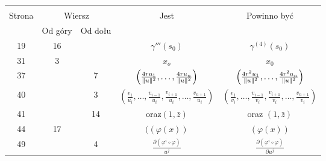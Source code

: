 \documentclass[a4paper,11pt]{article}
\begin{document}
\newpage


\vspace{\spaceFive}


\begin{center}

  \begin{tabular}{|c|c|c|c|c|}
    \hline
    & \multicolumn{2}{c|}{} & & \\
    Strona & \multicolumn{2}{c|}{Wiersz} & Jest
                              & Powinno być \\ \cline{2-3}
    & Od góry & Od dołu & & \\
    \hline
    19  & 16 & & $\gamma'''( s_{ 0 } )$ & $\gamma^{ (4) }( s_{ 0 } )$ \\
    31  &  3 & & $x_{ o }$ & $x_{ 0 }$ \\
    37  & & 7 & $\left( \frac{ 4 r u_{ 1 } }{ \lVert{  u  }\rVert^{ 2 } }, \ldots,
                \frac{ 4 r u_{ n } }{ \lVert{  u  }\rVert^{ 2 } } \right)$
           & $\left( \frac{ 4 r^{ 2 } u_{ 1 } }{ \lVert{  u  }\rVert^{ 2 } },
             \ldots, \frac{ 4 r^{ 2 } u_{ n } }{ \lVert{  u  }\rVert^{ 2 } }
             \right)$ \\
    40  & &  3 & $( \frac { v_{ 1 } }{ u_{ i } }, \ldots,
                 \frac{ v_{ i - 1 } }{ u_{ i } },
                 \frac{ v_{ i + 1 } }{ u_{ i } }, \ldots,
                 \frac{ v_{ n + 1 } }{ u_{ i } } )$
           & $( \frac{ v_{ 1 } }{ v_{ i } }, \ldots,
             \frac{ v_{ i - 1 } }{ v_{ i } },
             \frac{ v_{ i + 1 } }{ v_{ i } }, \ldots,
             \frac{ v_{ n + 1 } }{ v_{ i } } )$ \\
    41  & & 14 & oraz$( 1, \bar{ z } )$ & oraz $( 1, \bar{ z } )$ \\
    44  & 17 & & $( ( \varphi( x ) )$ & $( \varphi( x ) )$ \\
    49  & &  4 & $\frac{ \partial ( \varphi^{ i } \circ \varphi ) }{ u^{ j } }$
           & $\frac{ \partial ( \varphi^{ i } \circ \varphi ) }{ \partial u^{ j } }$ \\
    \hline
  \end{tabular}

\end{center}

\vspace{\spaceTwo}
\end{document}
